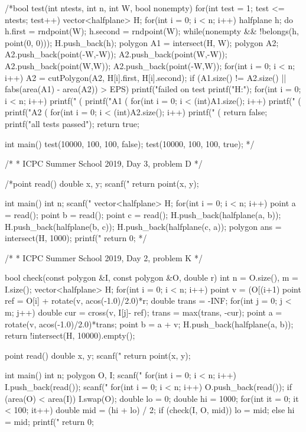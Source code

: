 \documentclass[11pt]{article}
\begin{document}
\begin{vncode}
/*bool test(int ntests, int n, int W, bool nonempty) {
	for(int test = 1; test <= ntests; test++) {
		vector<halfplane> H;
		for(int i = 0; i < n; i++) {
			halfplane h;
			do {
				h.first = rndpoint(W);
				h.second = rndpoint(W);
			} while(nonempty && !belongs(h, point(0, 0)));
			H.push_back(h);
		}
		polygon A1 = intersect(H, W);
		polygon A2;
		A2.push_back(point(-W,-W));
		A2.push_back(point(W,-W));
		A2.push_back(point(W,W));
		A2.push_back(point(-W,W));
		for(int i = 0; i < n; i++) {
			A2 = cutPolygon(A2, H[i].first, H[i].second);
		}
		if (A1.size() != A2.size() || fabs(area(A1) - area(A2)) > EPS) {
			printf("failed on test %
			printf("H:\n");
			for(int i = 0; i < n; i++)
				printf(" (%
			printf("A1 (%
			for(int i = 0; i < (int)A1.size(); i++) {
				printf(" (%
			}
			printf("A2 (%
			for(int i = 0; i < (int)A2.size(); i++) {
				printf(" (%
			}
			return false;
		}
	}
	printf("all tests passed\n");
	return true;
}

int main() {
	test(10000, 100, 100, false);
	test(10000, 100, 100, true);
}*/

/*
 * ICPC Summer School 2019, Day 3, problem D
 */

/*point read() {
	double x, y;
	scanf("%
	return point(x, y);
}

int main() {
	int n;
	scanf("%
	vector<halfplane> H;
	for(int i = 0; i < n; i++) {
		point a = read();
		point b = read();
		point c = read();
		H.push_back(halfplane(a, b));
		H.push_back(halfplane(b, c));
		H.push_back(halfplane(c, a));
	}
	polygon ans = intersect(H, 1000);
	printf("%
	return 0;
}*/

/*
 * ICPC Summer School 2019, Day 2, problem K
 */

bool check(const polygon &I, const polygon &O, double r) {
	int n = O.size(), m = I.size();
	vector<halfplane> H;
	for(int i = 0; i < n; i++) {
		point v = (O[(i+1)%
		point ref = O[i] + rotate(v, acos(-1.0)/2.0)*r;
		double trans = -INF;
		for(int j = 0; j < m; j++) {
			double cur = cross(v, I[j]- ref);
			trans = max(trans, -cur);
		}
		point a = rotate(v, acos(-1.0)/2.0)*trans;
		point b = a + v;
		H.push_back(halfplane(a, b));
	}
	return !intersect(H, 10000).empty();
}

point read() {
	double x, y;
	scanf("%
	return point(x, y);
}

int main() {
	int n;
	polygon O, I;
	scanf("%
	for(int i = 0; i < n; i++) I.push_back(read());
	scanf("%
	for(int i = 0; i < n; i++) O.push_back(read());
	if (area(O) < area(I)) I.swap(O);
	double lo = 0;
	double hi = 1000;
	for(int it = 0; it < 100; it++) {
		double mid = (hi + lo) / 2;
		if (check(I, O, mid)) lo = mid;
		else hi = mid;
	}
	printf("%
	return 0;
}
\end{vncode}
\endgroup
\end{document}
